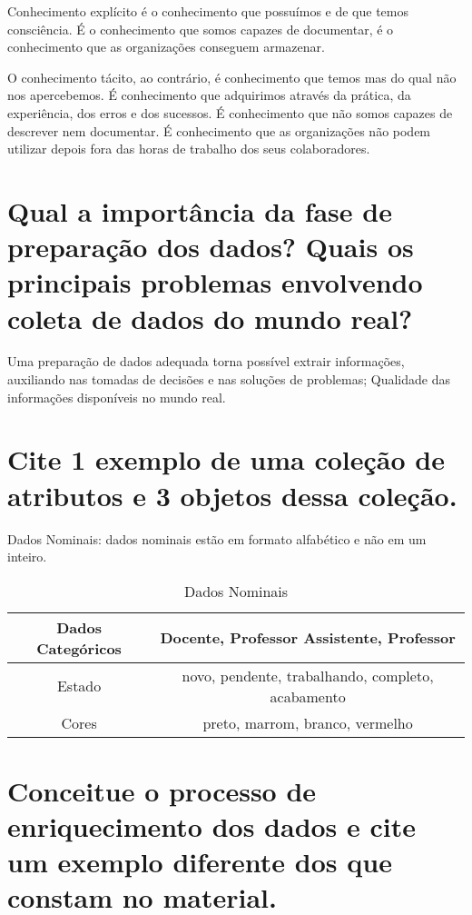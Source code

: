 Conhecimento explícito é o conhecimento que possuímos e de que temos consciência. É o conhecimento que somos capazes de documentar, é o conhecimento que as organizações conseguem armazenar.

O conhecimento tácito, ao contrário, é conhecimento que temos mas do qual não nos apercebemos. É conhecimento que adquirimos através da prática, da experiência, dos erros e dos sucessos. É conhecimento que não somos capazes de descrever nem documentar. É conhecimento que as organizações não podem utilizar depois fora das horas de trabalho dos seus colaboradores.
\cite{Kmol}

\section{Qual a importância da fase de preparação dos dados? Quais os principais problemas envolvendo coleta de dados do mundo real?}

Uma preparação de dados adequada torna possível extrair informações, auxiliando nas tomadas de decisões e nas soluções de problemas; Qualidade das informações disponíveis no mundo real.
\cite{IgtiBlog}

\section{Cite 1 exemplo de uma coleção de atributos e 3 objetos dessa coleção.}
Dados Nominais: dados nominais estão em formato alfabético e não em um inteiro.\cite{T4}

\noindent
\begin{table}[h]
    \begin{tabular}{c|c}
    \hline
         Dados Categóricos &  Docente, Professor Assistente, Professor \\\hline
         Estado & novo, pendente, trabalhando, completo, acabamento \\\hline
         Cores & preto, marrom, branco, vermelho \\
    \hline
    \end{tabular}
    \caption{Dados Nominais}
    \label{tab:my_label}
\end{table}


\section{Conceitue o processo de enriquecimento dos dados e cite um exemplo diferente dos que constam no material.}

